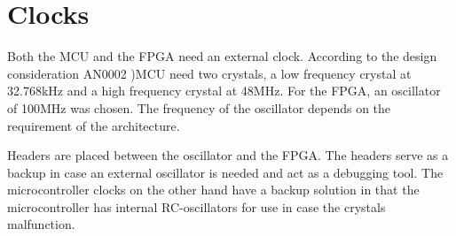 \documentclass[../main/report.tex]{subfiles}
\begin{document}
\section{Clocks}
Both the MCU and the FPGA need an external clock.
According to the design consideration AN0002 \cite{efm32gg-design-consideration})MCU need two crystals, a low frequency crystal at 32.768kHz and a high frequency crystal at 48MHz. 
For the FPGA, an oscillator of 100MHz was chosen. The frequency of the oscillator depends on the requirement of the architecture.

Headers are placed between the oscillator and the FPGA. 
The headers serve as a backup in case an external oscillator is needed and act as a debugging tool.
The microcontroller clocks on the other hand have a backup solution in that the microcontroller has internal RC-oscillators for use in case the crystals malfunction.
\end{document}
